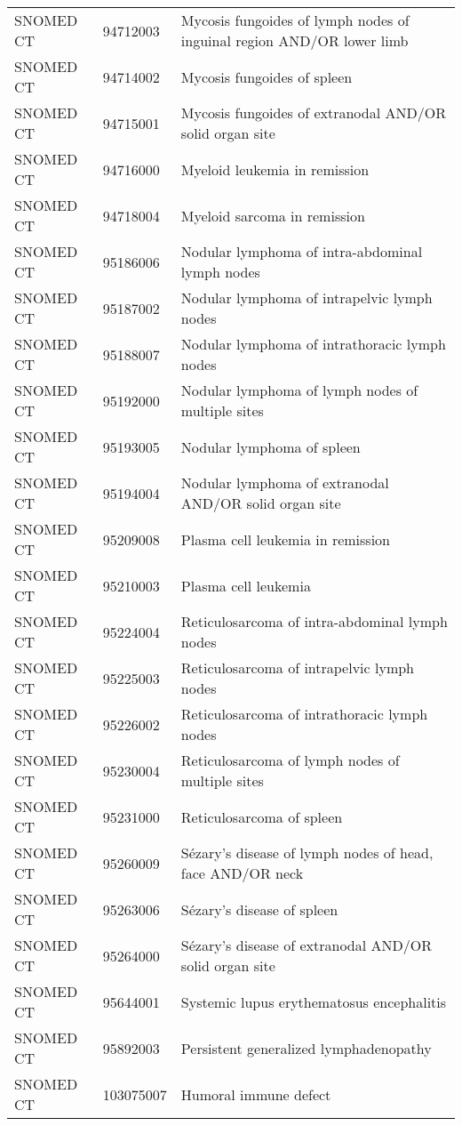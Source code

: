 \begin{table}[ht]
\begin{tabular}{lll}
  SNOMED CT & 94712003 & Mycosis fungoides of lymph nodes of inguinal region AND/OR lower limb \\ 
  SNOMED CT & 94714002 & Mycosis fungoides of spleen \\ 
  SNOMED CT & 94715001 & Mycosis fungoides of extranodal AND/OR solid organ site \\ 
  SNOMED CT & 94716000 & Myeloid leukemia in remission \\ 
  SNOMED CT & 94718004 & Myeloid sarcoma in remission \\ 
  SNOMED CT & 95186006 & Nodular lymphoma of intra-abdominal lymph nodes \\ 
  SNOMED CT & 95187002 & Nodular lymphoma of intrapelvic lymph nodes \\ 
  SNOMED CT & 95188007 & Nodular lymphoma of intrathoracic lymph nodes \\ 
  SNOMED CT & 95192000 & Nodular lymphoma of lymph nodes of multiple sites \\ 
  SNOMED CT & 95193005 & Nodular lymphoma of spleen \\ 
  SNOMED CT & 95194004 & Nodular lymphoma of extranodal AND/OR solid organ site \\ 
  SNOMED CT & 95209008 & Plasma cell leukemia in remission \\ 
  SNOMED CT & 95210003 & Plasma cell leukemia \\ 
  SNOMED CT & 95224004 & Reticulosarcoma of intra-abdominal lymph nodes \\ 
  SNOMED CT & 95225003 & Reticulosarcoma of intrapelvic lymph nodes \\ 
  SNOMED CT & 95226002 & Reticulosarcoma of intrathoracic lymph nodes \\ 
  SNOMED CT & 95230004 & Reticulosarcoma of lymph nodes of multiple sites \\ 
  SNOMED CT & 95231000 & Reticulosarcoma of spleen \\ 
  SNOMED CT & 95260009 & Sézary's disease of lymph nodes of head, face AND/OR neck \\ 
  SNOMED CT & 95263006 & Sézary's disease of spleen \\ 
  SNOMED CT & 95264000 & Sézary's disease of extranodal AND/OR solid organ site \\ 
  SNOMED CT & 95644001 & Systemic lupus erythematosus encephalitis \\ 
  SNOMED CT & 95892003 & Persistent generalized lymphadenopathy \\ 
  SNOMED CT & 103075007 & Humoral immune defect \\ 

\end{tabular}
\end{table}

